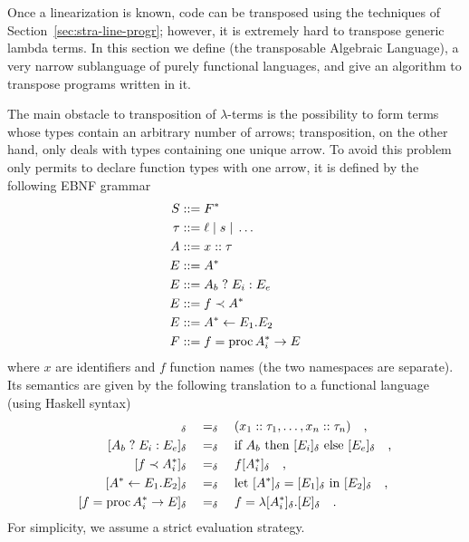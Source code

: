 \section{\tAL}
\label{sec:transAL}

Once a linearization is known, code can be transposed using the
techniques of Section~\ref{sec:stra-line-progr}; however, it is
extremely hard to transpose generic lambda terms.  In this section we
define \tAL{} (the
transposable Algebraic
Language), a very narrow sublanguage of purely functional languages,
and give an algorithm to transpose programs written in it.

The main obstacle to transposition of $\lambda$-terms is the
possibility to form terms whose types contain an arbitrary number of
arrows; transposition, on the other hand, only deals with types
containing one unique arrow. To avoid this problem \tAL{} only permits
to declare function types with one arrow, it is defined by the
following EBNF grammar
\begin{align}
  S &::= F^\ast\\
  \tau &::= \ell \;|\; s \;|\; \ldots\\
  A &::= x::\tau\\
  \label{eq:tAL-exp}
  E &::= A^\ast\\
  \label{eq:tAL-if}
  E &::= A_b \;?\; E_i : E_e\\
  \label{eq:tAL-apply}
  E &::= f \prec A^\ast\\
  \label{eq:tAL-let}
  E &::= A^\ast\leftarrow E_1.E_2\\
  \label{eq:tAL-fun}
  F &::= f = \operatorname{proc} A_i^\ast \rightarrow E
\end{align}
where $x$ are identifiers and $f$ function names (the two namespaces
are separate). Its semantics are given by the following translation to
a functional language (using Haskell syntax)
\begin{align}
  [x_1::\tau_1\cdots x_n::\tau_n]_\delta &\quad=_\delta\quad (x_1::\tau_1,\ldots,x_n::\tau_n)
  \quad\text{,}\\
  [A_b \;?\; E_i : E_e]_\delta &\quad=_\delta\quad
  \text{if }A_b\text{ then }[E_i]_\delta\text{ else }[E_e]_\delta
  \quad\text{,}\\
  [f \al A_i^\ast]_\delta &\quad=_\delta\quad
  f [A_i^\ast]_\delta \quad\text{,}\\
  [A^\ast\la E_1.E_2]_\delta &\quad=_\delta\quad
  \text{let } [A^\ast]_\delta = [E_1]_\delta \text{ in } [E_2]_\delta
  \quad\text{,}\\
  [f = \proc A_i^\ast \ra E]_\delta &\quad=_\delta\quad
  f = \lambda [A_i^\ast]_\delta.[E]_\delta\quad\text{.}
\end{align}
For simplicity, we assume a strict evaluation strategy.


